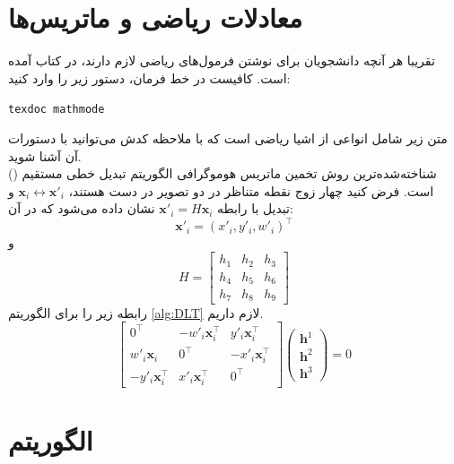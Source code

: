 \section{معادلات ریاضی و ماتریس‌ها}
تقریبا هر آنچه دانشجویان برای نوشتن فرمول‌های ریاضی لازم دارند، در کتاب
آمده است. کافیست در خط فرمان، دستور زیر را وارد کنید:
\begin{latin}
	\texttt{texdoc mathmode}
\end{latin}
متن زیر شامل انواعی از اشیا ریاضی است که با ملاحظه کدش می‌توانید با دستورات آن آشنا شوید.\\
شناخته‌شده‌ترین روش تخمین ماتریس هوموگرافی الگوریتم تبدیل خطی مستقیم () است. فرض کنید چهار زوج نقطه متناظر در دو تصویر در دست هستند، $\mathbf{x}_i\leftrightarrow\mathbf{x}'_i$ و تبدیل با رابطه
 $\mathbf{x}'_i = H\mathbf{x}_i$
 نشان داده می‌شود که در آن:
\[\mathbf{x}'_i=(x'_i,y'_i,w'_i)^\top \]
و
\[ H=\left[
\begin{array}{ccc}
h_1 & h_2 & h_3 \\
h_4 & h_5 & h_6 \\
h_7 & h_8 & h_9
\end{array}
\right]\]
رابطه زیر را برای الگوریتم \eqref{alg:DLT} لازم داریم.
\begin{equation}
\label{eq:DLT_Ah}
\left[
\begin{array}{ccc}
	0^\top & -w'_i\mathbf{x}_i^\top & y'_i\mathbf{x}_i^\top \\
	w'_i\mathbf{x}_i & 0^\top & -x'_i\mathbf{x}_i^\top \\
	- y'_i\mathbf{x}_i^\top & x'_i\mathbf{x}_i^\top & 0^\top
\end{array}
\right]
\left(
\begin{array}{c}
	\mathbf{h}^1 \\
	\mathbf{h}^2 \\
	\mathbf{h}^3
\end{array}
\right)=0
\end{equation}

\section{الگوریتم}


